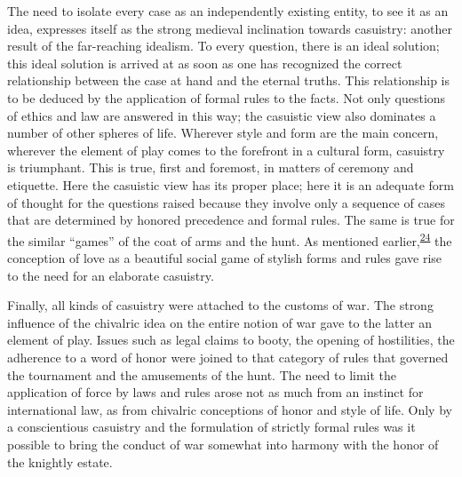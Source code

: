 The need to isolate every case as an independently existing entity, to
see it as an idea, expresses itself as the strong medieval inclination
towards casuistry: another result of the far-reaching idealism. To every
question, there is an ideal solution; this ideal solution is arrived at
as soon as one has recognized the correct relationship between the case
at hand and the eternal truths. This relationship is to be deduced by
the application of formal rules to the facts. Not only questions of
ethics and law are answered in this way; the casuistic view also
dominates a number of other spheres of life. Wherever style and form are
the main concern, wherever the element of play comes to the forefront in
a cultural form, casuistry is triumphant. This is true, first and
foremost, in matters of ceremony and etiquette. Here the casuistic view
has its proper place; here it is an adequate form of thought for the
questions raised because they involve only a sequence of cases that are
determined by honored precedence and formal rules. The same is true for
the similar ``games'' of the coat of arms and the hunt. As mentioned
earlier,\textsuperscript{\protect\hypertarget{18_Chapter_Eleven__THE_FORMS_OF_THO.xhtmlux5cux23id_584}{\protect\hyperlink{23_NOTES.xhtmlux5cux23id_585}{24}}}
the conception of love as a beautiful social game of stylish forms and
rules gave rise to the need for an elaborate casuistry.

Finally, all kinds of casuistry were attached to the customs of war. The
strong influence of the chivalric idea on the entire notion of war gave
to the latter an element of play. Issues such as legal
\protect\hypertarget{18_Chapter_Eleven__THE_FORMS_OF_THO.xhtmlux5cux23page_277}{}{}claims
to booty, the opening of hostilities, the adherence to a word of honor
were joined to that category of rules that governed the tournament and
the amusements of the hunt. The need to limit the application of force
by laws and rules arose not as much from an instinct for international
law, as from chivalric conceptions of honor and style of life. Only by a
conscientious casuistry and the formulation of strictly formal rules was
it possible to bring the conduct of war somewhat into harmony with the
honor of the knightly estate.

